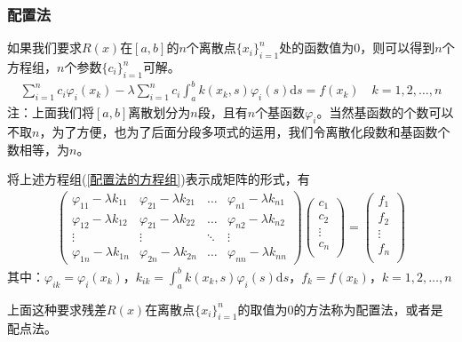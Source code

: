 		\subsubsection{配置法}
			\label{subsubsec:配置法}
			\par
			如果我们要求$R(x)$在$[a,b]$的$n$个离散点$\{x_i\}_{i = 1}^n$处的函数值为$0$，则可以得到$n$个方程组，$n$个参数$\{c_i\}_{i = 1}^n$可解。
			\begin{align}
				\label{配置法的方程组}
				\sum_{i =1}^n c_i \varphi_i(x_k) - \lambda \sum_{i =1}^n c_i \int_{a}^{b} k(x_k,s) \varphi_i(s)\mathrm{d}s = f(x_k)  \quad k = 1,2,\dots,n
			\end{align}
			注：上面我们将$[a,b]$离散划分为$n$段，且有$n$个基函数$\varphi_i$。当然基函数的个数可以不取$n$，为了方便，也为了后面分段多项式的运用，我们令离散化段数和基函数个数相等，为$n$。
			\par
			将上述方程组(\ref{配置法的方程组})表示成矩阵的形式，有
			\begin{align}
				\label{配置法方程组的矩阵形式}
				\begin{pmatrix}
				\varphi_{11} - \lambda k_{11}& \varphi_{21} - \lambda k_{21} &\dots &\varphi_{n1} - \lambda k_{n1}\\
				\varphi_{12} - \lambda k_{12}& \varphi_{21} - \lambda k_{22} &\dots &\varphi_{n2} - \lambda k_{n2}\\
				\vdots & \vdots & \ddots& \vdots \\
				\varphi_{1n} - \lambda k_{1n}& \varphi_{2n} - \lambda k_{2n} &\dots &\varphi_{nn} - \lambda k_{nn}
				\end{pmatrix}
				\begin{pmatrix}
				c_1 \\
				c_2 \\
				\vdots\\
				c_n \\
				\end{pmatrix}
				=
				\begin{pmatrix}
				f_1 \\
				f_2 \\
				\vdots\\
				f_n \\
				\end{pmatrix}
			\end{align}
			其中：$\varphi_{ik} = \varphi_i(x_k)$，$k_{ik} = \int_a^b k(x_k,s)\varphi_i(s)\mathrm{d}s$，$f_k = f(x_k)$，$k = 1,2,\dots,n$
			\par
			上面这种要求残差$R(x)$在离散点$\{x_i\}_{i = 1}^n$的取值为$0$的方法称为配置法，或者是配点法。

